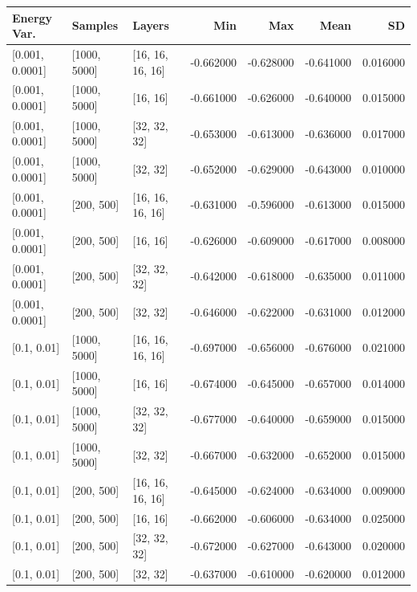 \begin{tabular}{lllrrrr}
\toprule
Energy Var. & Samples & Layers & Min & Max & Mean & SD \\
\midrule
{[0.001, 0.0001]} & [1000, 5000] & [16, 16, 16, 16] & -0.662000 & -0.628000 & -0.641000 & 0.016000 \\
{[0.001, 0.0001]} & [1000, 5000] & [16, 16] & -0.661000 & -0.626000 & -0.640000 & 0.015000 \\
{[0.001, 0.0001]} & [1000, 5000] & [32, 32, 32] & -0.653000 & -0.613000 & -0.636000 & 0.017000 \\
{[0.001, 0.0001]} & [1000, 5000] & [32, 32] & -0.652000 & -0.629000 & -0.643000 & 0.010000 \\
{[0.001, 0.0001]} & [200, 500] & [16, 16, 16, 16] & -0.631000 & -0.596000 & -0.613000 & 0.015000 \\
{[0.001, 0.0001]} & [200, 500] & [16, 16] & -0.626000 & -0.609000 & -0.617000 & 0.008000 \\
{[0.001, 0.0001]} & [200, 500] & [32, 32, 32] & -0.642000 & -0.618000 & -0.635000 & 0.011000 \\
{[0.001, 0.0001]} & [200, 500] & [32, 32] & -0.646000 & -0.622000 & -0.631000 & 0.012000 \\
{[0.1, 0.01]} & [1000, 5000] & [16, 16, 16, 16] & -0.697000 & -0.656000 & -0.676000 & 0.021000 \\
{[0.1, 0.01]} & [1000, 5000] & [16, 16] & -0.674000 & -0.645000 & -0.657000 & 0.014000 \\
{[0.1, 0.01]} & [1000, 5000] & [32, 32, 32] & -0.677000 & -0.640000 & -0.659000 & 0.015000 \\
{[0.1, 0.01]} & [1000, 5000] & [32, 32] & -0.667000 & -0.632000 & -0.652000 & 0.015000 \\
{[0.1, 0.01]} & [200, 500] & [16, 16, 16, 16] & -0.645000 & -0.624000 & -0.634000 & 0.009000 \\
{[0.1, 0.01]} & [200, 500] & [16, 16] & -0.662000 & -0.606000 & -0.634000 & 0.025000 \\
{[0.1, 0.01]} & [200, 500] & [32, 32, 32] & -0.672000 & -0.627000 & -0.643000 & 0.020000 \\
{[0.1, 0.01]} & [200, 500] & [32, 32] & -0.637000 & -0.610000 & -0.620000 & 0.012000 \\
\bottomrule
\end{tabular}

